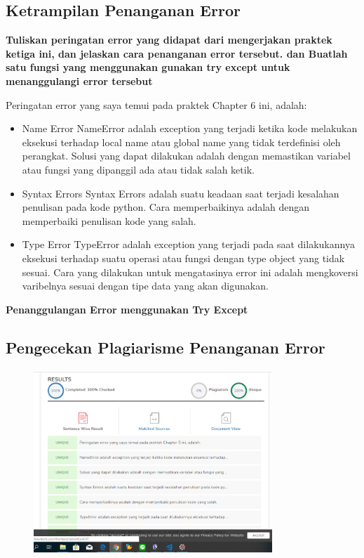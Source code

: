 \subsection{Ketrampilan Penanganan Error}
\textbf{Tuliskan peringatan error yang didapat dari mengerjakan praktek ketiga ini, dan jelaskan cara penanganan error tersebut. dan Buatlah satu fungsi yang menggunakan gunakan try except untuk menanggulangi error tersebut}

Peringatan error yang saya temui pada praktek Chapter 6 ini, adalah:
\begin{itemize}
	\item Name Error
	NameError adalah exception yang terjadi ketika kode melakukan eksekusi terhadap local name atau global name yang tidak terdefinisi oleh perangkat. Solusi yang dapat dilakukan adalah dengan memastikan variabel atau fungsi yang dipanggil ada atau tidak salah ketik.
	
	\item Syntax Errors
	Syntax Errors adalah suatu keadaan saat  terjadi kesalahan penulisan pada kode python. Cara memperbaikinya adalah dengan memperbaiki penulisan kode yang salah.
	
	\item Type Error
	TypeError adalah exception yang terjadi pada saat dilakukannya eksekusi terhadap suatu operasi atau fungsi dengan type object yang tidak sesuai. Cara yang dilakukan untuk mengatasinya error ini adalah mengkoversi varibelnya sesuai dengan tipe data yang akan digunakan.
\end{itemize}

\textbf{Penanggulangan Error menggunakan Try Except}


\subsection{Pengecekan Plagiarisme Penanganan Error}
\begin{figure}[H]
	\includegraphics[width=9cm]{figures/6/Praktek/1174096/Plagiarismeerror.png}
	\centering
\end{figure}

